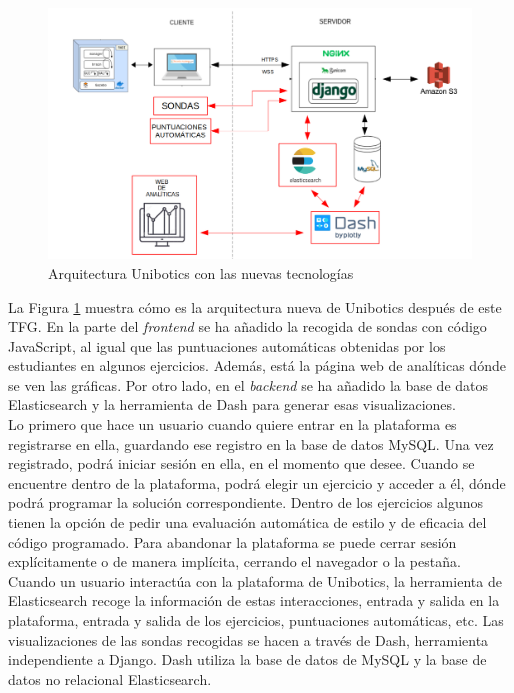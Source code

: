 \begin{figure}[H]
    \centering
    \includegraphics[width=14cm, keepaspectratio]{img/grafico2.png}
    \caption{Arquitectura Unibotics con las nuevas tecnologías}
    \label{fig:grafico2}
\end{figure}
La Figura \ref{fig:grafico2} muestra cómo es la arquitectura nueva de Unibotics después de este TFG. En la parte del \textit{frontend} se ha añadido la recogida de sondas con código JavaScript, al igual que las puntuaciones automáticas obtenidas por los estudiantes en algunos ejercicios. Además, está la página web de analíticas dónde se ven las gráficas. Por otro lado, en el \textit{backend} se ha añadido la base de datos Elasticsearch y la herramienta de Dash para generar esas visualizaciones.\\

Lo primero que hace un usuario cuando quiere entrar en la plataforma es registrarse en ella, guardando ese registro en la base de datos MySQL. Una vez registrado, podrá iniciar sesión en ella, en el momento que desee. Cuando se encuentre dentro de la plataforma, podrá elegir un ejercicio y acceder a él, dónde podrá programar la solución correspondiente. Dentro de los ejercicios algunos tienen la opción de pedir una evaluación automática de estilo y de eficacia del código programado. Para abandonar la plataforma se puede cerrar sesión explícitamente o de manera implícita, cerrando el navegador o la pestaña.\\

Cuando un usuario interactúa con la plataforma de Unibotics, la herramienta de Elasticsearch recoge la información de estas interacciones, entrada y salida en la plataforma, entrada y salida de los ejercicios, puntuaciones automáticas, etc. Las visualizaciones de las sondas recogidas se hacen a través de Dash, herramienta independiente a Django. Dash utiliza la base de datos de MySQL y la base de datos no relacional Elasticsearch.
